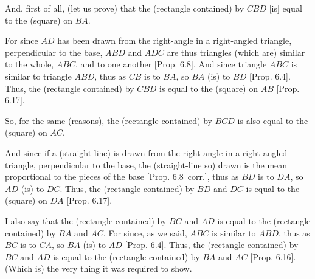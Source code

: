 \begin{Parallel}{}{}
{And, first of all, (let us prove) that the (rectangle contained) by
$CBD$ [is] equal to the (square) on $BA$.

\epsfysize=2in
\centerline{}

For since $AD$ has been drawn from the right-angle  in a right-angled triangle,
perpendicular to the base, $ABD$ and $ADC$ are thus
triangles (which are) similar to the whole, $ABC$, and to one another
[Prop. 6.8]. And since triangle $ABC$ is
similar to triangle $ABD$, thus as $CB$ is to $BA$, so $BA$ (is)
to $BD$ [Prop. 6.4]. Thus, the
(rectangle contained) by $CBD$ is equal to the (square) on $AB$
[Prop. 6.17].

So, for the same (reasons), the (rectangle contained) by $BCD$
is also equal to the (square) on $AC$.

And since if a (straight-line) is drawn from the right-angle in a right-angled
triangle,  perpendicular to the base, the (straight-line so) drawn
is the mean proportional to the pieces of the base [Prop. 6.8~corr.], thus as $BD$ is to $DA$, so $AD$ (is) to $DC$. Thus, the (rectangle contained) by
$BD$ and $DC$ is equal to the (square) on $DA$ [Prop. 6.17]. 

I also say that the (rectangle contained) by $BC$ and
$AD$ is equal to the (rectangle contained) by $BA$ and $AC$.
For since,  as we said, $ABC$ is similar to $ABD$, thus as $BC$
is to $CA$, so $BA$ (is) to $AD$ [Prop. 6.4].
Thus, the (rectangle contained) by $BC$ and $AD$
is equal to the (rectangle contained) by $BA$ and $AC$ [Prop. 6.16].
(Which is) the very thing it was required to show.}
\end{Parallel}

